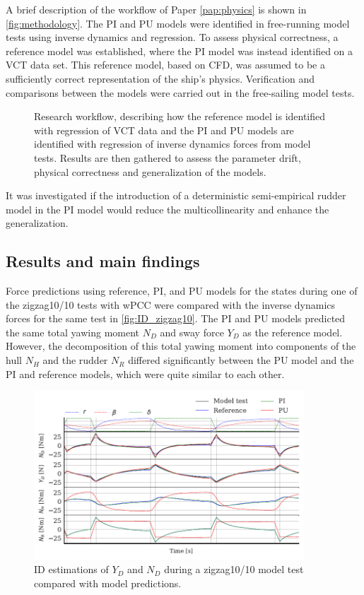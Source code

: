 A brief description of the workflow of Paper \ref{pap:physics} is shown in \autoref{fig:methodology}.
The PI and PU models were identified in free-running model tests using inverse dynamics and regression. To assess physical correctness, a reference model was established, where the PI model was instead identified on a VCT data set. This reference model, based on CFD, was assumed to be a sufficiently correct representation of the ship's physics.
Verification and comparisons between the models were carried out in the free-sailing model tests.
\begin{figure}[h]
  \centering
  
  \caption{Research workflow, describing how the reference model is identified with regression of VCT data and the PI and PU models are identified with regression of inverse dynamics forces from model tests. Results are then gathered to assess the parameter drift, physical correctness and generalization of the models.}
  \label{fig:methodology}
\end{figure}
It was investigated if the introduction of a deterministic semi-empirical rudder model in the PI model would reduce the multicollinearity and enhance the generalization.

\FloatBarrier
\subsection*{Results and main findings}
Force predictions using reference, PI, and PU models for the states during one of the zigzag10/10 tests with wPCC were compared with the inverse dynamics forces for the same test in \autoref{fig:ID_zigzag10}. The PI and PU models predicted the same total yawing moment $N_D$ and sway force $Y_D$ as the reference model. However, the decomposition of this total yawing moment into components of the hull $N_H$ and the rudder $N_R$ differed significantly between the PU model and the PI and reference models, which were quite similar to each other.

\begin{figure}[h] \centering \includegraphics[width=0.9\textwidth]{kappa/images/results.ID_zigzag10.pdf} \caption{ID estimations of $Y_D$ and $N_D$ during a zigzag10/10 model test compared with model predictions.} \label{fig:ID_zigzag10} \end{figure}

